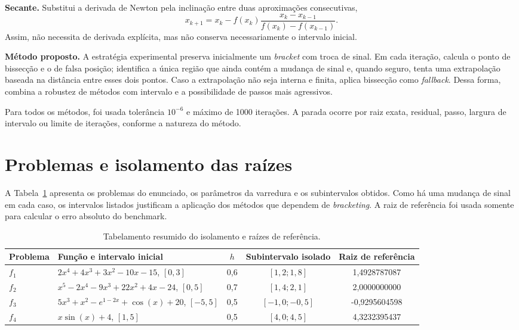 \documentclass[12pt,a4paper]{article}
\begin{document}
\textbf{Secante.} Substitui a derivada de Newton pela inclinação entre duas aproximações consecutivas,
\[
x_{k+1}=x_k-f(x_k)\frac{x_k-x_{k-1}}{f(x_k)-f(x_{k-1})}.
\]
Assim, não necessita de derivada explícita, mas não conserva necessariamente o intervalo inicial.

\textbf{Método proposto.} A estratégia experimental preserva inicialmente um \textit{bracket} com troca de sinal. Em cada iteração, calcula o ponto de bissecção e o de falsa posição; identifica a única região que ainda contém a mudança de sinal e, quando seguro, tenta uma extrapolação baseada na distância entre esses dois pontos. Caso a extrapolação não seja interna e finita, aplica bissecção como \textit{fallback}. Dessa forma, combina a robustez de métodos com intervalo e a possibilidade de passos mais agressivos.

Para todos os métodos, foi usada tolerância $10^{-6}$ e máximo de 1000 iterações. A parada ocorre por raiz exata, residual, passo, largura de intervalo ou limite de iterações, conforme a natureza do método.

\section{Problemas e isolamento das raízes}

A Tabela~\ref{tab:isolamento} apresenta os problemas do enunciado, os parâmetros da varredura e os subintervalos obtidos. Como há uma mudança de sinal em cada caso, os intervalos listados justificam a aplicação dos métodos que dependem de \textit{bracketing}. A raiz de referência foi usada somente para calcular o erro absoluto do benchmark.

\begin{table}[H]
\centering
\caption{Tabelamento resumido do isolamento e raízes de referência.}
\label{tab:isolamento}
\small
\begin{tabular}{p{1.1cm}p{6.5cm}c c c}
\toprule
Problema & Função e intervalo inicial & $h$ & Subintervalo isolado & Raiz de referência \\
\midrule
$f_1$ & $2x^4+4x^3+3x^2-10x-15$, $[0,3]$ & 0,6 & $[1,2;1,8]$ & 1,4928787087 \\
$f_2$ & $x^5-2x^4-9x^3+22x^2+4x-24$, $[0,5]$ & 0,7 & $[1,4;2,1]$ & 2,0000000000 \\
$f_3$ & $5x^3+x^2-e^{1-2x}+\cos(x)+20$, $[-5,5]$ & 0,5 & $[-1,0;-0,5]$ & -0,9295604598 \\
$f_4$ & $x\sin(x)+4$, $[1,5]$ & 0,5 & $[4,0;4,5]$ & 4,3232395437 \\
\bottomrule
\end{tabular}
\end{table}
\end{document}

